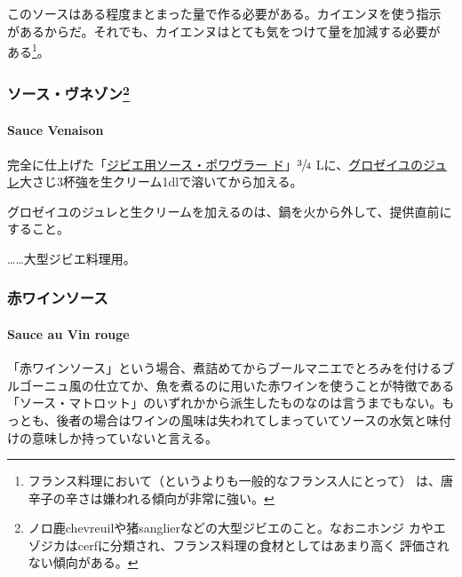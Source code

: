 このソースはある程度まとまった量で作る必要がある。カイエンヌを使う指示
があるからだ。それでも、カイエンヌはとても気をつけて量を加減する必要が
ある\footnote{フランス料理において（というよりも一般的なフランス人にとって）
  は、唐辛子の辛さは嫌われる傾向が非常に強い。}。

\maeaki

\hypertarget{ux30bdux30fcux30b9ux30f4ux30cdux30beux30f395}{%
\subsubsection[ソース・ヴネゾン]{\texorpdfstring{ソース・ヴネゾン\footnote{ノロ鹿chevreuilや猪sanglierなどの大型ジビエのこと。なおニホンジ
  カやエゾジカはcerfに分類され、フランス料理の食材としてはあまり高く
  評価されない傾向がある。}}{ソース・ヴネゾン}}\label{ux30bdux30fcux30b9ux30f4ux30cdux30beux30f395}}

\hypertarget{sauce-venaison}{%
\paragraph{Sauce Venaison}\label{sauce-venaison}}

完全に仕上げた「\protect\hyperlink{sauce-poivrade-pour-gibier}{ジビエ用ソース・ポワヴラー
ド}」\(\sfrac{3}{4}\)
Lに、\href{}{グロゼイユのジュレ}大さじ3杯強を生クリーム1dlで溶いてから加える。

グロゼイユのジュレと生クリームを加えるのは、鍋を火から外して、提供直前にすること。

\ldots{}\ldots{}大型ジビエ料理用。

\maeaki

\hypertarget{ux8d64ux30efux30a4ux30f3ux30bdux30fcux30b9}{%
\subsubsection{赤ワインソース}\label{ux8d64ux30efux30a4ux30f3ux30bdux30fcux30b9}}

\hypertarget{sauce-au-vin-rouge}{%
\paragraph{Sauce au Vin rouge}\label{sauce-au-vin-rouge}}


「赤ワインソース」という場合、煮詰めてからブールマニエでとろみを付けるブルゴーニュ風の仕立てか、魚を煮るのに用いた赤ワインを使うことが特徴である「ソース・マトロット」のいずれかから派生したものなのは言うまでもない。もっとも、後者の場合はワインの風味は失われてしまっていてソースの水気と味付けの意味しか持っていないと言える。

